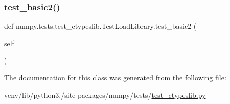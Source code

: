\subsubsection{\texorpdfstring{test\+\_\+basic2()}{test\_basic2()}}
{\footnotesize\ttfamily def numpy.\+tests.\+test\+\_\+ctypeslib.\+Test\+Load\+Library.\+test\+\_\+basic2 (\begin{DoxyParamCaption}\item[{}]{self }\end{DoxyParamCaption})}



The documentation for this class was generated from the following file\+:\begin{DoxyCompactItemize}
\item 
venv/lib/python3./site-\/packages/numpy/tests/\hyperlink{test__ctypeslib_8py}{test\+\_\+ctypeslib.\+py}\end{DoxyCompactItemize}
